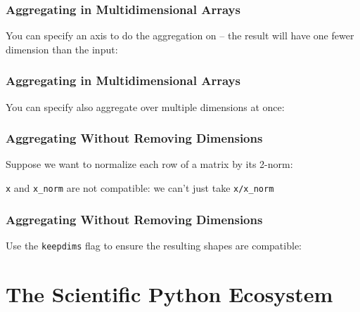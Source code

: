 \documentclass[xcolor={x11names,table}]{beamer}
\begin{document}
\begin{frame}
	\frametitle{Aggregating in Multidimensional Arrays}
	
	You can specify an axis to do the aggregation on -- the result will have one fewer dimension than the input:
	
\end{frame}

\begin{frame}
	\frametitle{Aggregating in Multidimensional Arrays}
	
	You can specify also aggregate over multiple dimensions at once:
	
\end{frame}

\begin{frame}
	\frametitle{Aggregating Without Removing Dimensions}
	Suppose we want to normalize each row of a matrix by its 2-norm:
	
	\texttt{x} and \texttt{x\_norm} are not compatible: we can't just take \texttt{x/x\_norm}
\end{frame}

\begin{frame}
	\frametitle{Aggregating Without Removing Dimensions}
	Use the \texttt{keepdims} flag to ensure the resulting shapes are compatible:
	
\end{frame}

\section{The Scientific Python Ecosystem}
\end{document}
